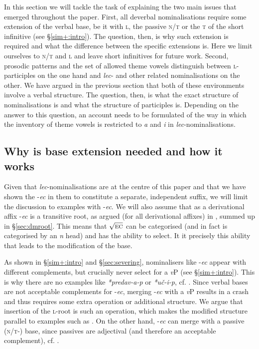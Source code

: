 \documentclass[output=paper,colorlinks,citecolor=brown]{langscibook}
\begin{document}
In this section we will tackle the task of explaining the two main issues that emerged throughout the paper.  First, all deverbal nominalisations require some extension of the verbal base, be it with \textsc{l}, the passive \textsc{n/t} or the \textsc{t} of the short infinitive (see \S \ref{sim+:intro}). The question, then, is why such extension is required and what the difference between the specific extensions is. Here we limit ourselves to \textsc{n/t} and \textsc{l} and leave short infinitives for future work.
Second, prosodic patterns and the set of allowed theme vowels distinguish between \textsc{l}-participles on the one hand and \textit{lec}- and other related nominalisations on the other. We have argued in the previous section that both of these environments involve a verbal structure. The question, then, is what the exact structure of nominalisations is and what the structure of participles is. Depending on the answer to this question, an account needs to be formulated of the way in which the inventory of theme vowels is restricted to \textit{a} and \textit{i} in \textit{lec}-nominalisations.
 


\subsection{Why is base extension needed and how it works}
Given that \textit{lec}-nominalisations are at the centre of this paper and that we have shown the -\textit{ec} in them to constitute a separate, independent suffix, we will limit the discussion to examples with -\textit{ec}. We will also assume that as a derivational affix -\textit{ec} is a transitive root, as argued (for all derivational affixes) in \citet{lowenstamm2014}, summed up in \S \ref{sec:dmroot}. This means that $\sqrt{\textsc{ec}}$ can be categorised (and in fact is categorised by an \textit{n} head) and has the ability to select. It it precisely this ability that leads to the modification of the base.

As shown in \S \ref{sim+:intro} and \S\ref{sec:severing}, nominalisers like  -\textit{ec} appear with different complements, but crucially never select for a \textit{v}P (see \S \ref{sim+:intro}). This is why there are no examples like \textit{*predav-a-p} or \textit{*uč-i-p}, cf. . 
Since verbal bases are not acceptable complements for -\textit{ec}, merging -\textit{ec} with a \textit{v}P 
results in a crash and thus requires some extra operation or additional structure. We argue that insertion of the \textsc{l}-root is such an operation, which makes the modified structure parallel to examples such as . 
On the other hand,  -\textit{ec}  can merge with a passive (\textsc{n/t-}) base, since passives are adjectival (and therefore an acceptable complement), cf. . 
\end{document}
